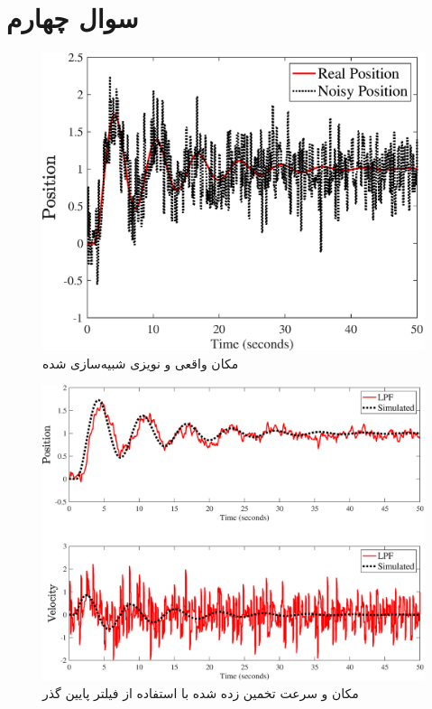 \section{سوال چهارم}

 \begin{figure}[H]
	\centering
	\includegraphics[width=\linewidth]{../Figure/Q4/real_vs_noisy}
	
	\caption{مکان واقعی و نویزی شبیه‌سازی شده}
\end{figure}


 \begin{figure}[H]
	\centering
	\includegraphics[width=\linewidth]{../Figure/Q4/LPF}
	
	\caption{مکان و سرعت تخمین زده شده با استفاده از فیلتر پایین گذر}
\end{figure}

